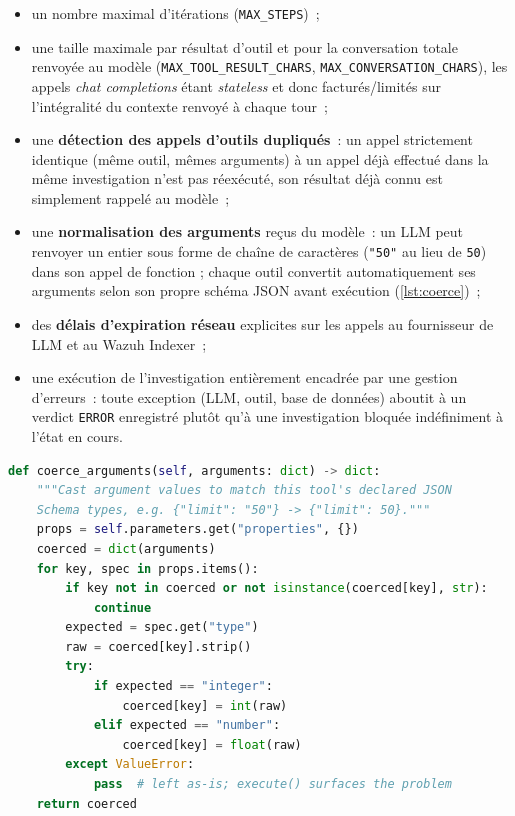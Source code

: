 \begin{itemize}
  \item un nombre maximal d'itérations (\texttt{MAX\_STEPS})~;
  \item une taille maximale par résultat d'outil et pour la conversation
        totale renvoyée au modèle (\texttt{MAX\_TOOL\_RESULT\_CHARS},
        \texttt{MAX\_CONVERSATION\_CHARS}), les appels \textit{chat
        completions} étant \textit{stateless} et donc facturés/limités sur
        l'intégralité du contexte renvoyé à chaque tour~;
  \item une \textbf{détection des appels d'outils dupliqués}~: un appel
        strictement identique (même outil, mêmes arguments) à un appel déjà
        effectué dans la même investigation n'est pas réexécuté, son
        résultat déjà connu est simplement rappelé au modèle~;
  \item une \textbf{normalisation des arguments} reçus du modèle~: un LLM
        peut renvoyer un entier sous forme de chaîne de caractères
        (\texttt{"50"} au lieu de \texttt{50}) dans son appel de fonction ;
        chaque outil convertit automatiquement ses arguments selon son
        propre schéma JSON avant exécution (\cref{lst:coerce})~;
  \item des \textbf{délais d'expiration réseau} explicites sur les appels
        au fournisseur de LLM et au Wazuh Indexer~;
  \item une exécution de l'investigation entièrement encadrée par une
        gestion d'erreurs~: toute exception (LLM, outil, base de données)
        aboutit à un verdict \texttt{ERROR} enregistré plutôt qu'à une
        investigation bloquée indéfiniment à l'état \og en cours\fg.
\end{itemize}

\begin{lstlisting}[language=Python, caption={Normalisation générique des
arguments d'un outil selon son schéma JSON}, label={lst:coerce}]
def coerce_arguments(self, arguments: dict) -> dict:
    """Cast argument values to match this tool's declared JSON
    Schema types, e.g. {"limit": "50"} -> {"limit": 50}."""
    props = self.parameters.get("properties", {})
    coerced = dict(arguments)
    for key, spec in props.items():
        if key not in coerced or not isinstance(coerced[key], str):
            continue
        expected = spec.get("type")
        raw = coerced[key].strip()
        try:
            if expected == "integer":
                coerced[key] = int(raw)
            elif expected == "number":
                coerced[key] = float(raw)
        except ValueError:
            pass  # left as-is; execute() surfaces the problem
    return coerced
\end{lstlisting}

